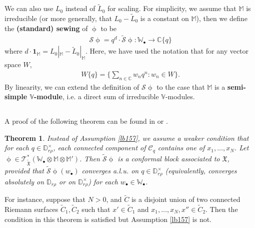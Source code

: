 \documentclass[11pt,b5paper,notitlepage]{article}
\theoremstyle{definition}
\theoremstyle{plain}
\newtheorem{thm}[df]{Theorem}
\newcommand{\fk}{\mathfrak}
\newcommand{\mc}{\mathcal}
\newcommand{\wtd}{\widetilde}
\newcommand{\id}{\mathbf{1}}
\newcommand{\scr}{\mathscr}
\newcommand{\blt}{\bullet}
\newcommand{\Vbb}{\mathbb V}
\newcommand{\Wbb}{\mathbb W}
\newcommand{\Mbb}{\mathbb M}
\newcommand{\Cbb}{\mathbb C}
\newcommand{\Dbb}{\mathbb D}
\numberwithin{equation}{section}
\begin{document}
We can also use $L_0$ instead of $\wtd L_0$ for scaling. For simplicity, we assume that $\Mbb$ is irreducible (or more generally, that $L_0-\wtd L_0$ is a constant on $\Mbb$), then we define the \textbf{(standard) sewing} of $\upphi$ to be \index{S@$\mc S\upphi$, the standard sewing}
\begin{align}
\mc S\upphi=q^d\cdot\wtd{\mc S}\upphi:\Wbb_\blt\rightarrow\Cbb\{q\} 
\end{align} 
where $d\cdot \id_\Mbb=L_0|_\Mbb-\wtd L_0|_\Mbb$. Here, we have used the notation that for any vector space $W$, 
\begin{align*}
W\{q\}=\Big\{\sum_{n\in\Cbb} w_nq^n:w_n\in W\Big\}.
\end{align*}
By linearity, we can extend the definition of $\mc S\upphi$ to the case that $\Mbb$ is a \textbf{semi-simple $\Vbb$-module},  i.e. a direct sum of irreducible $\Vbb$-modules.


\subsection{}

A proof of the following theorem can be found in \cite[Sec. 3.3]{Gui} or \cite[Sec. 10, 11]{Gui20}.

\begin{thm}\label{lb159}
Instead of Assumption \ref{lb157}, we assume a weaker condition that for each $q\in\Dbb_{r\rho}^\times$, each connected component of $\mc C_q$ contains one of $x_1,\dots,x_N$. Let $\upphi\in\scr T^*_{\wtd{\fk X}}(\Wbb_\blt\otimes\Mbb\otimes\Mbb')$. Then $\wtd{\mc S}\upphi$ is a conformal block associated to $\fk X$, provided that  $\wtd{\mc S}\upphi(w_\blt)$ converges a.l.u. on $q\in\Dbb_{r\rho}^\times$ (equivalently, converges absolutely on $\Dbb_{r\rho}$ or on $\Dbb_{r\rho}^\times$) for each $w_\blt\in\Wbb_\blt$.
\end{thm}

For instance, suppose that $N>0$, and $\wtd C$ is a disjoint union of two connected Riemann surfaces $\wtd C_1,\wtd C_2$ such that  $x'\in\wtd C_1$ and $x_1,\dots,x_N,x''\in\wtd C_2$. Then the condition in this theorem is satisfied but Assumption \ref{lb157} is not.
\end{document}

